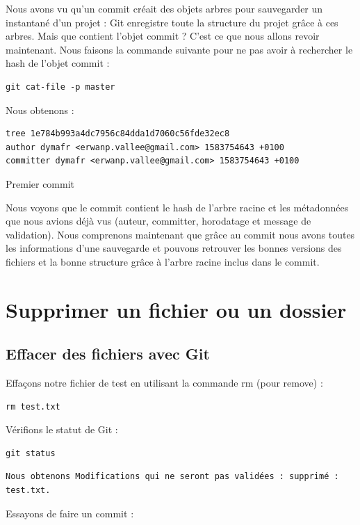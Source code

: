 \documentclass{article}
\begin{document}
Nous avons vu qu'un commit créait des objets arbres pour sauvegarder un instantané d'un projet : {\color{blue}Git} enregistre toute la structure du projet grâce à ces arbres. Mais que contient l'objet commit ? C'est ce que nous allons revoir maintenant. Nous faisons la commande suivante pour ne pas avoir à rechercher le {\color{blue}hash} de l'objet commit :


\begin{verbatim}
git cat-file -p master
\end{verbatim}

Nous obtenons :
\begin{verbatim}
tree 1e784b993a4dc7956c84dda1d7060c56fde32ec8
author dymafr <erwanp.vallee@gmail.com> 1583754643 +0100
committer dymafr <erwanp.vallee@gmail.com> 1583754643 +0100
\end{verbatim}
Premier commit

Nous voyons que le {\color{blue}commit} contient le {\color{blue}hash} de l'arbre racine et les métadonnées que nous avions déjà vus (auteur, {\color{blue}committer}, horodatage et message de validation). Nous comprenons maintenant que grâce au {\color{blue}commit} nous avons toutes les informations d'une sauvegarde et pouvons retrouver les bonnes versions des fichiers et la bonne structure grâce à l'arbre racine inclus dans le {\color{blue}commit}.


\section{Supprimer un fichier ou un dossier}
\subsection{Effacer des fichiers avec {\color{blue}Git}}
Effaçons notre fichier de test en utilisant la commande {\color{blue}rm} (pour {\color{blue}remove}) :

\begin{verbatim}
rm test.txt
\end{verbatim}
Vérifions le statut de {\color{blue}Git} :

\begin{verbatim}
git status
\end{verbatim}
\begin{verbatim}
Nous obtenons Modifications qui ne seront pas validées : supprimé : test.txt.
\end{verbatim}
Essayons de faire un {\color{blue}commit} :
\end{document}
